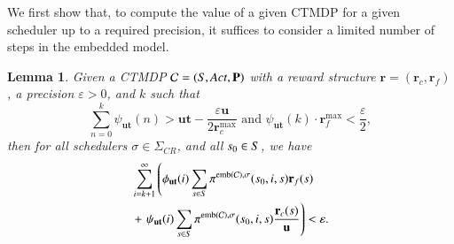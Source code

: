 \documentclass[10pt,twocolumn]{article}
\newtheorem{lemma}{Lemma}
\newcommand{\states} {{\ensuremath S}}
\newcommand{\state}  {{\ensuremath s}}
\newcommand{\sched}  {{\ensuremath {\sigma}}}
\newcommand{\acts}{\mathit{Act}}
\newcommand{\pmat}{\mathbf{P}}
\newcommand{\cmodel}{\mathcal{C}}
\newcommand{\urate}{\mathbf{u}}
\newcommand{\schedscr}{\Sigma_\mathit{CR}}
\newcommand{\rew}{\mathbf{r}}
\newcommand{\frew}{\mathbf{r}_f}
\newcommand{\crew}{\mathbf{r}_c}
\newcommand{\timeb}{\mathbf{t}}
\newcommand{\precision}{\varepsilon}
\newcommand{\emb}{\mathrm{emb}}
\newcommand{\tprob}{\pi}
\begin{document}
We first show that, to compute the value of a given CTMDP for a given scheduler up to a required precision, it suffices to consider a limited number of steps in the embedded model.
\begin{lemma}
  \label{lem:precbound:appendix}
Given a CTMDP $\cmodel = (\states, \acts, \pmat)$ with a reward structure $\rew = (\crew, \frew)$, a precision $\precision > 0$, and $k$ such that
\[
  \sum_{n=0}^k\psi_{\urate \timeb}(n) > \urate \timeb - \frac{\precision \urate}{2\crew^{\max}} \mbox{ and } \psi_{\urate \timeb}(k) \cdot \frew^{\max} < \frac{\precision}{2},
  \]
then for all schedulers $\sched \in \schedscr$, and all $\state_0 \in \states$, we have
\begin{equation*}
\begin{split}
  & \sum_{i=k+1}^\infty \left(\phi_{\urate \timeb}(i) \sum_{\state \in \states} \tprob^{\emb(\cmodel),\sched}(\state_0, i, \state) \frew(\state)\right. \\
  & + \left.\psi_{\urate \timeb}(i) \sum_{\state \in \states} \tprob^{\emb(\cmodel),\sched}(\state_0, i, \state)
    \frac{\crew(\state)}{\urate}\right) < \precision .
\end{split}
\end{equation*}
\end{lemma}
\end{document}
